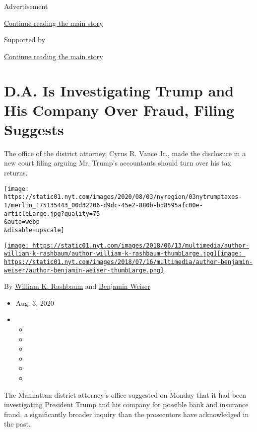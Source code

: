 Advertisement

\protect\hyperlink{after-top}{Continue reading the main story}

Supported by

\protect\hyperlink{after-sponsor}{Continue reading the main story}

\hypertarget{da-is-investigating-trump-and-his-company-over-fraud-filing-suggests}{%
\section{D.A. Is Investigating Trump and His Company Over Fraud, Filing
Suggests}\label{da-is-investigating-trump-and-his-company-over-fraud-filing-suggests}}

The office of the district attorney, Cyrus R. Vance Jr., made the
disclosure in a new court filing arguing Mr. Trump's accountants should
turn over his tax returns.

\texttt{[image: https://static01.nyt.com/images/2020/08/03/nyregion/03nytrumptaxes-1/merlin\_175135443\_00d32206-d9dc-45e2-880b-bd8595afc00e-articleLarge.jpg?quality=75\\\&auto=webp\\\&disable=upscale]}

\href{https://www.nytimes.com/by/william-k-rashbaum}{\texttt{[image: https://static01.nyt.com/images/2018/06/13/multimedia/author-william-k-rashbaum/author-william-k-rashbaum-thumbLarge.jpg]}}\href{https://www.nytimes.com/by/benjamin-weiser}{\texttt{[image: https://static01.nyt.com/images/2018/07/16/multimedia/author-benjamin-weiser/author-benjamin-weiser-thumbLarge.png]}}

By \href{https://www.nytimes.com/by/william-k-rashbaum}{William K.
Rashbaum} and \href{https://www.nytimes.com/by/benjamin-weiser}{Benjamin
Weiser}

\begin{itemize}
\item
  Aug. 3, 2020
\item
  \begin{itemize}
  \item
  \item
  \item
  \item
  \item
  \item
  \end{itemize}
\end{itemize}

The Manhattan district attorney's office suggested on Monday that it had
been investigating President Trump and his company for possible bank and
insurance fraud, a significantly broader inquiry than the prosecutors
have acknowledged in the past.

